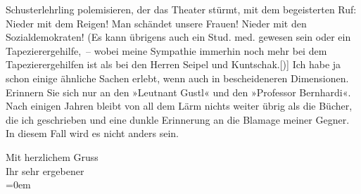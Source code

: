                Schusterlehrling polemisieren, der das Theater stürmt, mit dem begeisterten Ruf:
               Nieder mit dem Reigen! Man schändet unsere Frauen! Nieder mit den Sozialdemokraten!
               (Es kann übrigens auch ein Stud. med. gewesen sein oder ein Tapezierergehilfe, –
               wobei meine Sympathie immerhin noch mehr bei dem Tapezierergehilfen ist als bei den
               Herren Seipel und Kuntschak.{[}){]} Ich habe ja schon einige
               ähnliche Sachen erlebt, wenn auch in bescheideneren Dimensionen. Erinnern Sie sich
               nur an den »Leutnant Gustl« und den »Professor Bernhardi«. Nach einigen Jahren bleibt
               von all dem Lärm nichts weiter übrig als die Bücher, die ich geschrieben und eine
               dunkle Erinnerung an die Blamage meiner Gegner. In diesem Fall wird es nicht anders
               sein.\pend
           
\pstart
           Mit herzlichem Gruss{\\[\baselineskip]}Ihr sehr ergebener{\\[\baselineskip]}\pend
           \leftskip=0em{}\endnumbering{}  
      